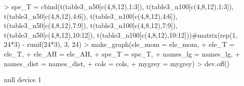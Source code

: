 \documentclass{article}
\begin{document}
\begin{Schunk}
\begin{Sinput}
> spe_T = cbind(t(table3_n50[c(4,8,12),1:3]), t(table3_n100[c(4,8,12),1:3]), t(table3_n50[c(4,8,12),4:6]), t(table3_n100[c(4,8,12),4:6]), t(table3_n50[c(4,8,12),7:9]), t(table3_n100[c(4,8,12),7:9]), t(table3_n50[c(4,8,12),10:12]), t(table3_n100[c(4,8,12),10:12]))#matrix(rep(1, 24*3) - runif(24*3), 3, 24)
> make_graph(ele_mom = ele_mom,
+            ele_T = ele_T,
+            ele_AH = ele_AH,
+            spe_T = spe_T,
+            names_lg = names_lg,
+            names_dist = names_dist,
+            cols = cols,
+            mygrey = mygrey)
> dev.off()
\end{Sinput}
\begin{Soutput}
null device 
          1 
\end{Soutput}
\end{Schunk}

\begin{figure}

\end{figure}
\end{document}
